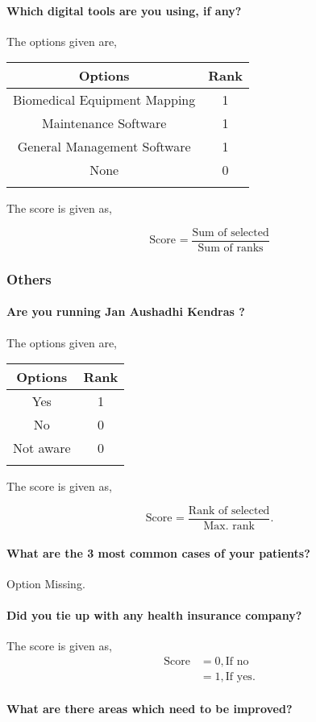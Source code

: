 \documentclass[oneside]{article}
\newcommand{\tsub}[2]{\text{#1}_{\text{#2}}}
\newcommand{\dsub}[2]{\dfrac{\text{#1}}{\text{#2}}}
\newcommand{\multsel}[1]
{
	\[
		\tsub{Score}{#1} = \dsub{Sum of selected}{Sum of ranks}
	\]
}
\newcommand{\singsel}[1]
{
	\[
		\tsub{Score}{#1} = \dsub{Rank of selected}{Max. rank}.
	\]
}
\newenvironment{ttable}
{
\begin{center}
\begin{tabular}{c|c}
\hline
}
{
\\ \hline
\end{tabular}
\end{center}
}
\begin{document}
\paragraph{ Which digital tools are you using, if any?}

The options given are,
\begin{ttable}
Options & Rank \\ \hline
Biomedical Equipment Mapping & 1 \\
Maintenance Software & 1 \\
General Management Software & 1 \\
None & 0 \\
\hline
\end{ttable}
The score is given as,
\multsel{}
\subsubsection{Others}

\paragraph{ Are you running Jan Aushadhi Kendras ?}

The options given are,
\begin{ttable}
Options & Rank \\ \hline
Yes & 1 \\
No & 0 \\
Not aware & 0 \\
\hline
\end{ttable}
The score is given as,
\singsel{}
\paragraph{ What are the 3 most common cases of your patients?}
Option Missing.

\paragraph{ Did you tie up with any health insurance company?}

The score is given as,
\begin{align*}
\tsub{Score}{} &= 0, \text{If no} \\
        &= 1, \text{If yes}.
\end{align*}
\paragraph{ What are there areas which need to be improved?}
\end{document}

